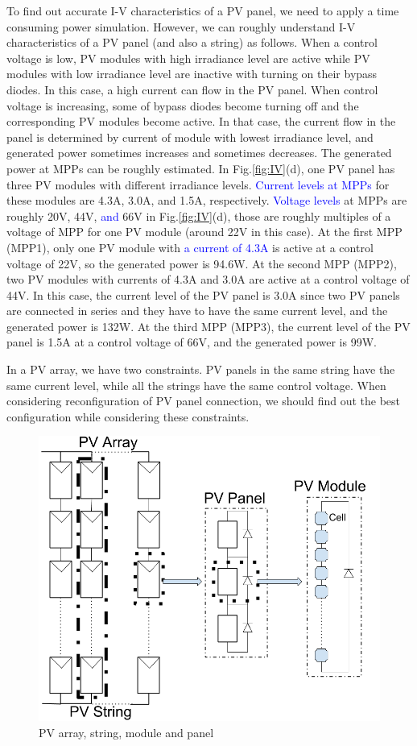 \documentclass[conference]{pvsctran}
\newcommand{\michiko}{\textcolor{blue}}
\begin{document}
To find out accurate I-V characteristics of a PV panel, we need to apply a time consuming power simulation. 
However, we can roughly understand I-V characteristics of a PV panel (and also a string) as follows. 
When a control voltage is low, PV modules with high irradiance level are active while PV modules with low irradiance level are inactive with turning on their bypass diodes.
In this case, a high current can flow in the PV panel. When control voltage is increasing, some of bypass diodes become turning off and the corresponding PV modules become active. 
In that case, the current flow in the panel is determined by current of module with lowest irradiance level, and generated power sometimes increases and sometimes decreases.
The generated power at MPPs can be roughly estimated. 
In Fig.\ref{fig:IV}(d), one PV panel has three PV modules with different irradiance levels. 
\michiko{Current levels at MPPs} for these modules are 4.3A, 3.0A, and 1.5A, respectively. 
\michiko{Voltage levels} at MPPs are roughly 20V, 44V, \michiko{and} 66V in Fig.\ref{fig:IV}(d), those are roughly multiples of a voltage of MPP for one PV module (around 22V in this case). 
At the first MPP (MPP1), only one PV module with \michiko{a current of 4.3A} is active at a control voltage of 22V, so the generated power is 94.6W. 
At the second MPP (MPP2), two PV modules with currents of 4.3A and 3.0A are active at a control voltage of 44V. 
In this case, the current level of the PV panel is 3.0A since two PV panels are connected in series and they have to have the same current level, and the generated power is 132W.
At the third MPP (MPP3), the current level of the PV panel is 1.5A at a control voltage of 66V, and the generated power is 99W. 

In a PV array, we have two constraints. 
PV panels in the same string have the same current level, while all the strings have the same control voltage. 
When considering reconfiguration of PV panel connection, we should find out the best configuration while considering these constraints. 

\begin{figure}[t]
    \centering
    \includegraphics[width=0.8\linewidth]{../fig/module.png}
    \caption{PV array, string, module and panel}
    \label{model}
\end{figure}
\end{document}
